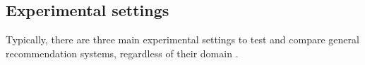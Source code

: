 





\subsection{Experimental settings}\label{sec:experimental_settings}
Typically, there are three main experimental settings to test and compare general recommendation systems, regardless of their domain \autocite{herlocker04evaluating, shani11evaluating, lu12recommender}.

